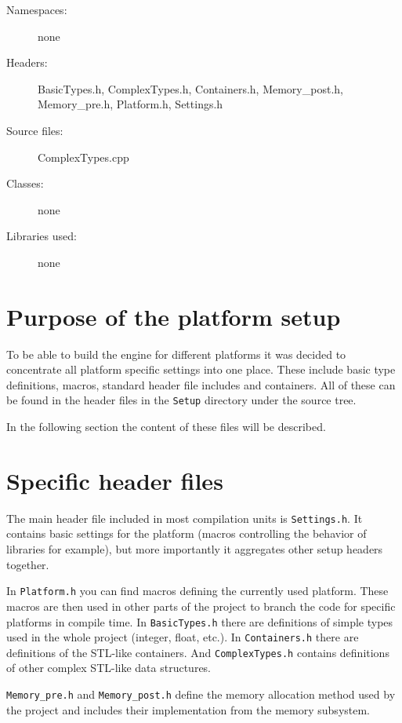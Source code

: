 \begin{description}
  \item[Namespaces:] none
  \item[Headers:] BasicTypes.h, ComplexTypes.h, Containers.h, Memory\_post.h, Me\-mo\-ry\-\_pre.h, Platform.h, Settings.h
  \item[Source files:] ComplexTypes.cpp
  \item[Classes:] none
  \item[Libraries used:] none
\end{description}


\section{Purpose of the platform setup}
To be able to build the engine for different platforms it was decided to concentrate all platform specific settings into one place. These include basic type definitions, macros, standard header file includes and containers. All of these can be found in the header files in the \verb/Setup/ directory under the source tree.

In the following section the content of these files will be described.


\section{Specific header files}
The main header file included in most compilation units is \verb/Settings.h/. It contains basic settings for the platform (macros controlling the behavior of libraries for example), but more importantly it aggregates other setup headers together.

In \verb/Platform.h/ you can find macros defining the currently used platform. These macros are then used in other parts of the project to branch the code for specific platforms in compile time. In \verb/BasicTypes.h/ there are definitions of simple types used in the whole project (integer, float, etc.). In \verb/Containers.h/ there are definitions of the STL-like containers. And \verb/ComplexTypes.h/ contains definitions of other complex STL-like data structures.

\verb/Memory_pre.h/ and \verb/Memory_post.h/ define the memory allocation method used by the project and includes their implementation from the memory subsystem.


%


